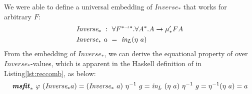 We were able to define a universal embedding of $\textit{Inverse}_{*}$
that works for arbitrary $F$:\vspace*{-1ex}
\begin{align*}
&\textit{Inverse}_{*} ~:~ \forall F^{*\to*}.\forall A^{*}.A \to \mu_{*}' F A \\
&\textit{Inverse}_{*}~a ~=~ \textit{in}_{L} (\eta~a)
\end{align*}
From the embedding of $\textit{Inverse}_{*}$, we can derive the equational
property of \msfit{*} over $\textit{Inverse}_{*}$-values, which is apparent
in the Haskell definition of \msfit{*} in Listing\;\ref{lst:reccomb},
as below:\vspace*{-1ex}
\[
\textbf{\textit{msfit}}_{*}~\varphi~(\textit{Inverse}_{*} a) =
(\textit{Inverse}_{*}~a)~\eta^{-1}~g
= \textit{in}_{L}~(\eta~a)~\eta^{-1}~g = \eta^{-1}(\eta~a) = a
\]

